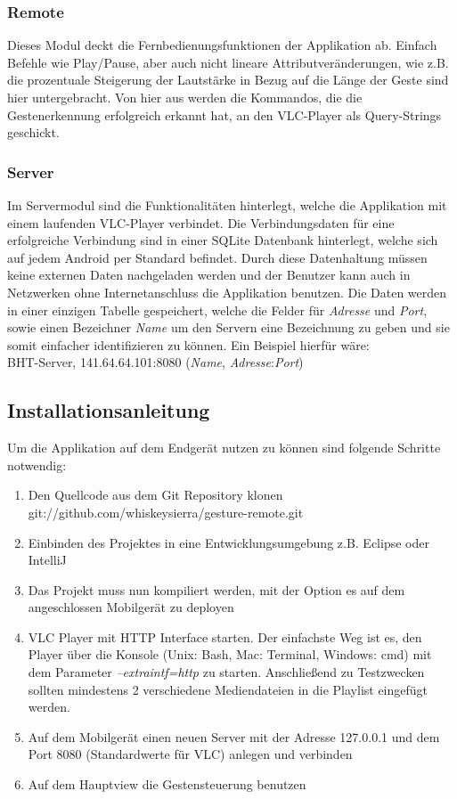 \documentclass[a4paper,12pt]{article}
\begin{document}
\subsubsection{Remote}
Dieses Modul deckt die Fernbedienungsfunktionen der Applikation ab. Einfach Befehle wie Play/Pause, aber auch nicht lineare Attributveränderungen, wie z.B. die prozentuale Steigerung der Lautstärke in Bezug auf die Länge der Geste sind hier untergebracht. Von hier aus werden die Kommandos, die die Gestenerkennung erfolgreich erkannt hat, an den VLC-Player als Query-Strings geschickt.
\subsubsection{Server}
Im Servermodul sind die Funktionalitäten hinterlegt, welche die Applikation mit einem laufenden VLC-Player verbindet. Die Verbindungsdaten für eine erfolgreiche Verbindung sind in einer SQLite Datenbank hinterlegt, welche sich auf jedem Android per Standard befindet. Durch diese Datenhaltung müssen keine externen Daten nachgeladen werden und der Benutzer kann auch in Netzwerken ohne Internetanschluss die Applikation benutzen.
Die Daten werden in einer einzigen Tabelle gespeichert, welche die Felder für \textit{Adresse} und \textit{Port}, sowie einen Bezeichner \textit{Name} um den Servern eine Bezeichnung zu geben und sie somit einfacher identifizieren zu können. Ein Beispiel hierfür wäre: \\
BHT-Server, 141.64.64.101:8080 (\textit{Name}, \textit{Adresse}:\textit{Port})\\

\newpage
\subsection{Installationsanleitung}
Um die Applikation auf dem Endgerät nutzen zu können sind folgende Schritte notwendig:
\begin{enumerate}
\item Den Quellcode aus dem Git Repository klonen \\git://github.com/whiskeysierra/gesture-remote.git
\item Einbinden des Projektes in eine Entwicklungsumgebung z.B. Eclipse oder IntelliJ
\item Das Projekt muss nun kompiliert werden, mit der Option es auf dem angeschlossen Mobilgerät zu deployen
\item VLC Player mit HTTP Interface starten. Der einfachste Weg ist es, den Player über die Konsole (Unix: Bash, Mac: Terminal, Windows: cmd) mit dem Parameter \textit{--extraintf=http} zu starten. Anschließend zu Testzwecken sollten mindestens 2 verschiedene Mediendateien in die Playlist eingefügt werden.
\item Auf dem Mobilgerät einen neuen Server mit der Adresse 127.0.0.1 und dem Port 8080 (Standardwerte für VLC) anlegen und verbinden
\item Auf dem Hauptview die Gestensteuerung benutzen
\end{enumerate}
\newpage
\end{document}
